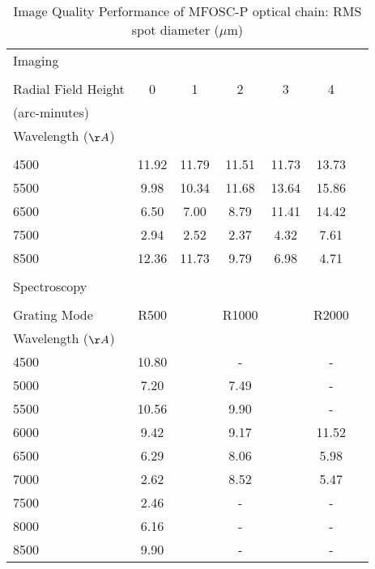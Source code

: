 \begin{table}
	\centering
	\caption{Image Quality Performance of MFOSC-P optical chain:  RMS spot diameter ($\mu$m)}
	\begin{tabular}{lcccccc}
		\hline        
		\hline                                                                   
		Imaging  &       &       &      &       &     \\ 
		&       &       &      &       &     \\                            
		\hline
		Radial Field Height   & 0  &  1  & 2  &  3  & 4   \\
		(arc-minutes)           &    &     &    &     &     \\
		\hline                            
		Wavelength ($\AA$)     &     &     &    &     &     \\
		\hline
		&       &       &      &       &     \\                  
		4500   & 11.92 & 11.79 & 11.51 & 11.73 & 13.73 \\
		5500   &  9.98 & 10.34 & 11.68 & 13.64 & 15.86 \\
		6500   &  6.50 &  7.00 &  8.79 & 11.41 & 14.42 \\
		7500   &  2.94 &  2.52 &  2.37 &  4.32 &  7.61 \\
		8500   & 12.36 & 11.73 &  9.79 &  6.98 &  4.71 \\
		\hline
		&       &       &      &       &     \\
		Spectroscopy  &       &       &      &       &     \\
		&       &       &      &       &     \\
		\hline
		Grating Mode    & R500  &    & R1000  &    & R2000   \\
		\hline                            
		Wavelength ($\AA$)     &     &     &    &     &     \\
		\hline
		
		4500   &   10.80    &  &   -           &  &   -           \\
		5000   &    7.20    &  &   7.49    &  &   -             \\
		5500   &   10.56    &  &   9.90    &  &   -             \\
		6000   &    9.42    &  &   9.17    &  &   11.52  \\
		6500   &    6.29    &  &   8.06    &  &    5.98         \\
		7000   &    2.62    &  &   8.52    &  &    5.47         \\
		7500   &    2.46    &  &   -           &  &   -             \\
		8000   &    6.16    &  &   -           &  &   -             \\
		8500   &    9.90    &  &   -           &  &   -             \\          
		\hline
		\hline
	\end{tabular}
	\label{table-IQ}
	

\end{table}
